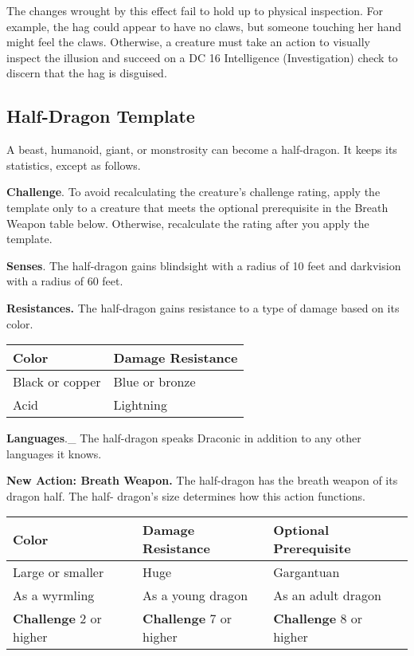 \documentclass[
]{article}
\begin{document}
The changes wrought by this effect fail to hold up to physical
inspection. For example, the hag could appear to have no claws, but
someone touching her hand might feel the claws. Otherwise, a creature
must take an action to visually inspect the illusion and succeed on a DC
16 Intelligence (Investigation) check to discern that the hag is
disguised.

\hypertarget{half-dragon-template}{%
\subsection{Half-Dragon Template}\label{half-dragon-template}}

A beast, humanoid, giant, or monstrosity can become a half-dragon. It
keeps its statistics, except as follows.

\textbf{Challenge}. To avoid recalculating the creature's challenge
rating, apply the template only to a creature that meets the optional
prerequisite in the Breath Weapon table below. Otherwise, recalculate
the rating after you apply the template.

\textbf{Senses}. The half-dragon gains blindsight with a radius of 10
feet and darkvision with a radius of 60 feet.

\textbf{Resistances.} The half-dragon gains resistance to a type of
damage based on its color.

\begin{longtable}[]{@{}ll@{}}
\toprule
\textbf{Color} & \textbf{Damage Resistance}\tabularnewline
\midrule
\endhead
Black or copper & Blue or bronze\tabularnewline
Acid & Lightning\tabularnewline
\bottomrule
\end{longtable}

\textbf{Languages}.\_ The half-dragon speaks Draconic in addition to any
other languages it knows.

\textbf{New Action: Breath Weapon.} The half-dragon has the breath
weapon of its dragon half. The half- dragon's size determines how this
action functions.

\begin{longtable}[]{@{}lll@{}}
\toprule
\textbf{Color} & \textbf{Damage Resistance} & Optional
Prerequisite\tabularnewline
\midrule
\endhead
Large or smaller & Huge & Gargantuan\tabularnewline
As a wyrmling & As a young dragon & As an adult dragon\tabularnewline
\textbf{Challenge} 2 or higher & \textbf{Challenge} 7 or higher &
\textbf{Challenge} 8 or higher\tabularnewline
\bottomrule
\end{longtable}
\end{document}
